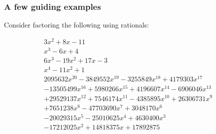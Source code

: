 \begin{frame}
\frametitle{A few guiding examples}
Consider factoring the following using rationals:

\[
\begin{array}{l}
3 x^{2}+8x-11 \\\hline
x^{3}-6 x+4\\\hline
6 x^{3}-19 x^{2}+17 x-3\\
x^{4}-11 x^{2}+1\\\hline
2095632 x^{20}-3849552 x^{19}-3255849 x^{18}+4179303 x^{17}\\
-13505499 x^{16}+5980266 x^{15}+4196607 x^{14}-6906046 x^{13}\\
+29529137 x^{12}+7546174 x^{11}-4385895 x^{10}+26306731 x^{9}\\
+7651238 x^{8}-47703690 x^{7}+3048170 x^{6}\\
-20029315 x^{5}-25010625 x^{4}+4630400 x^{3}\\
-17212025 x^{2}+14818375 x+17892875
\end{array}
\]


\end{frame}